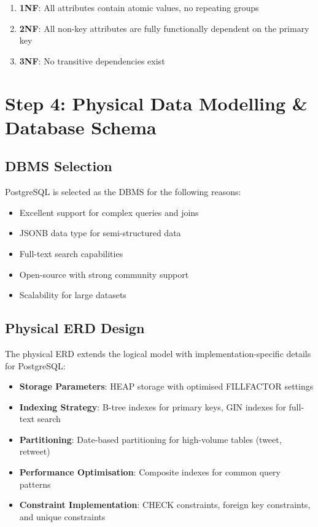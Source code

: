 \documentclass[12pt,a4paper]{report}
\begin{document}
\begin{enumerate}
    \item \textbf{1NF}: All attributes contain atomic values, no repeating groups
    \item \textbf{2NF}: All non-key attributes are fully functionally dependent on the primary key
    \item \textbf{3NF}: No transitive dependencies exist
\end{enumerate}

\chapter{Step 4: Physical Data Modelling \& Database Schema}

\section{DBMS Selection}

PostgreSQL is selected as the DBMS for the following reasons:
\begin{itemize}
    \item Excellent support for complex queries and joins
    \item JSONB data type for semi-structured data
    \item Full-text search capabilities
    \item Open-source with strong community support
    \item Scalability for large datasets
\end{itemize}

\section{Physical ERD Design}

The physical ERD extends the logical model with implementation-specific details for PostgreSQL:

\begin{itemize}
    \item \textbf{Storage Parameters}: HEAP storage with optimised FILLFACTOR settings
    \item \textbf{Indexing Strategy}: B-tree indexes for primary keys, GIN indexes for full-text search
    \item \textbf{Partitioning}: Date-based partitioning for high-volume tables (tweet, retweet)
    \item \textbf{Performance Optimisation}: Composite indexes for common query patterns
    \item \textbf{Constraint Implementation}: CHECK constraints, foreign key constraints, and unique constraints
\end{itemize}
\end{document}
